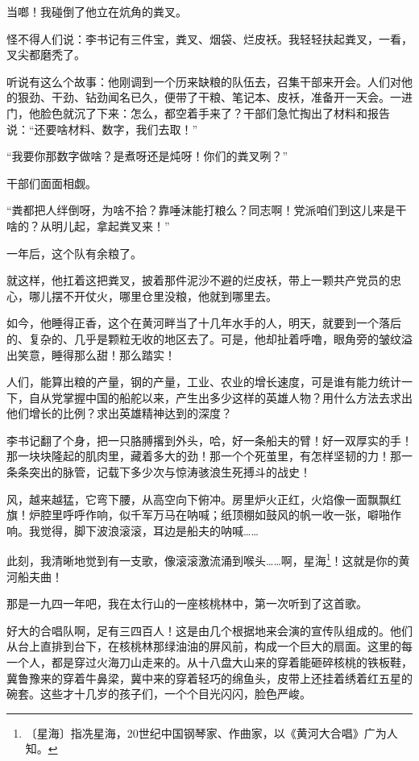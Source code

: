 \documentclass[12pt,UTF-8,openany]{ctexbook}
\begin{document}
\begin{normalsize}
    当啷！我碰倒了他立在炕角的粪叉。
    
    怪不得人们说：李书记有三件宝，粪叉、烟袋、烂皮袄。我轻轻扶起粪叉，一看，叉尖都磨秃了。
    
    听说有这么个故事：他刚调到一个历来缺粮的队伍去，召集干部来开会。人们对他的狠劲、干劲、钻劲闻名已久，便带了干粮、笔记本、皮袄，准备开一天会。一进门，他脸色就沉了下来：怎么，都空着手来了？干部们急忙掏出了材料和报告说：“还要啥材料、数字，我们去取！”
    
    “我要你那数字做啥？是煮呀还是炖呀！你们的粪叉咧？”
    
    干部们面面相觑。
    
    “粪都把人绊倒呀，为啥不拾？靠唾沫能打粮么？同志啊！党派咱们到这儿来是干啥的？从明儿起，拿起粪叉来！”
    
    一年后，这个队有余粮了。
    
    就这样，他扛着这把粪叉，披着那件泥沙不避的烂皮袄，带上一颗共产党员的忠心，哪儿摆不开仗火，哪里仓里没粮，他就到哪里去。
    
    如今，他睡得正香，这个在黄河畔当了十几年水手的人，明天，就要到一个落后的、复杂的、几乎是颗粒无收的地区去了。可是，他却扯着呼噜，眼角旁的皱纹溢出笑意，睡得那么甜！那么踏实！
    
    人们，能算出粮的产量，钢的产量，工业、农业的增长速度，可是谁有能力统计一下，自从党掌握中国的船舵以来，产生出多少这样的英雄人物？用什么方法去求出他们增长的比例？求出英雄精神达到的深度？
    
    李书记翻了个身，把一只胳膊撂到外头，哈，好一条船夫的臂！好一双厚实的手！那一块块隆起的肌肉里，藏着多大的劲！那一个个死茧里，有怎样坚韧的力！那一条条突出的脉管，记载下多少次与惊涛骇浪生死搏斗的战史！
    
    风，越来越猛，它弯下腰，从高空向下俯冲。房里炉火正红，火焰像一面飘飘红旗！炉腔里呼呼作响，似千军万马在呐喊；纸顶棚如鼓风的帆一收一张，噼啪作响。我觉得，脚下波浪滚滚，耳边是船夫的呐喊……
    
    此刻，我清晰地觉到有一支歌，像滚滚激流涌到喉头……啊，星海\footnote{〔星海〕指冼星海，20世纪中国钢琴家、作曲家，以《黄河大合唱》广为人知。}！这就是你的黄河船夫曲！
    
    那是一九四一年吧，我在太行山的一座核桃林中，第一次听到了这首歌。
    
    好大的合唱队啊，足有三四百人！这是由几个根据地来会演的宣传队组成的。他们从台上直排到台下，在核桃林那绿油油的屏风前，构成一个巨大的扇面。这里的每一个人，都是穿过火海刀山走来的。从十八盘大山来的穿着能砸碎核桃的铁板鞋，冀鲁豫来的穿着牛鼻梁，冀中来的穿着轻巧的绵鱼头，皮带上还挂着绣着红五星的碗套。这些才十几岁的孩子们，一个个目光闪闪，脸色严峻。
    

\end{normalsize}
\end{document}
